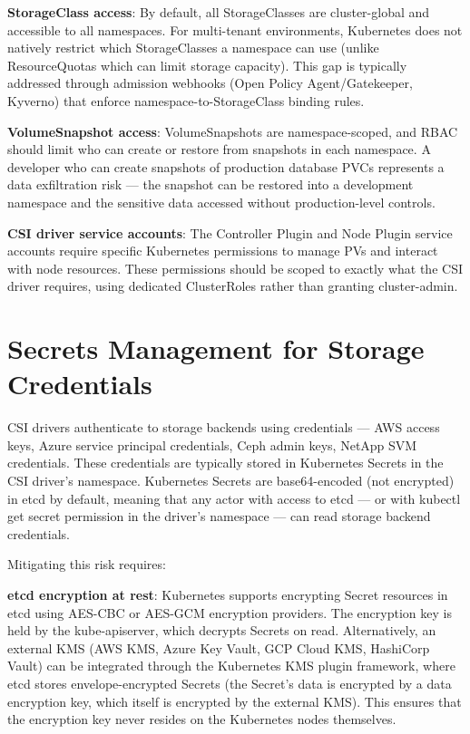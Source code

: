 \textbf{StorageClass access}: By default, all StorageClasses are cluster-global and accessible to all namespaces. For multi-tenant environments, Kubernetes does not natively restrict which StorageClasses a namespace can use (unlike ResourceQuotas which can limit storage capacity). This gap is typically addressed through admission webhooks (Open Policy Agent/Gatekeeper, Kyverno) that enforce namespace-to-StorageClass binding rules.

\textbf{VolumeSnapshot access}: VolumeSnapshots are namespace-scoped, and RBAC should limit who can create or restore from snapshots in each namespace. A developer who can create snapshots of production database PVCs represents a data exfiltration risk --- the snapshot can be restored into a development namespace and the sensitive data accessed without production-level controls.

\textbf{CSI driver service accounts}: The Controller Plugin and Node Plugin service accounts require specific Kubernetes permissions to manage PVs and interact with node resources. These permissions should be scoped to exactly what the CSI driver requires, using dedicated ClusterRoles rather than granting cluster-admin.

\section{Secrets Management for Storage Credentials}
CSI drivers authenticate to storage backends using credentials --- AWS access keys, Azure service principal credentials, Ceph admin keys, NetApp SVM credentials. These credentials are typically stored in Kubernetes Secrets in the CSI driver's namespace. Kubernetes Secrets are base64-encoded (not encrypted) in etcd by default, meaning that any actor with access to etcd --- or with kubectl get secret permission in the driver's namespace --- can read storage backend credentials.

Mitigating this risk requires:

\textbf{etcd encryption at rest}: Kubernetes supports encrypting Secret resources in etcd using AES-CBC or AES-GCM encryption providers. The encryption key is held by the kube-apiserver, which decrypts Secrets on read. Alternatively, an external KMS (AWS KMS, Azure Key Vault, GCP Cloud KMS, HashiCorp Vault) can be integrated through the Kubernetes KMS plugin framework, where etcd stores envelope-encrypted Secrets (the Secret's data is encrypted by a data encryption key, which itself is encrypted by the external KMS). This ensures that the encryption key never resides on the Kubernetes nodes themselves.

